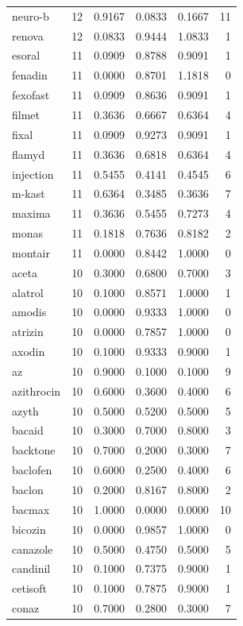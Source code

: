 \begin{longtable}{p{3.0cm}rrrrr}
neuro-b & 12 & 0.9167 & 0.0833 & 0.1667 & 11 \\
renova & 12 & 0.0833 & 0.9444 & 1.0833 & 1 \\
esoral & 11 & 0.0909 & 0.8788 & 0.9091 & 1 \\
fenadin & 11 & 0.0000 & 0.8701 & 1.1818 & 0 \\
fexofast & 11 & 0.0909 & 0.8636 & 0.9091 & 1 \\
filmet & 11 & 0.3636 & 0.6667 & 0.6364 & 4 \\
fixal & 11 & 0.0909 & 0.9273 & 0.9091 & 1 \\
flamyd & 11 & 0.3636 & 0.6818 & 0.6364 & 4 \\
injection & 11 & 0.5455 & 0.4141 & 0.4545 & 6 \\
m-kast & 11 & 0.6364 & 0.3485 & 0.3636 & 7 \\
maxima & 11 & 0.3636 & 0.5455 & 0.7273 & 4 \\
monas & 11 & 0.1818 & 0.7636 & 0.8182 & 2 \\
montair & 11 & 0.0000 & 0.8442 & 1.0000 & 0 \\
aceta & 10 & 0.3000 & 0.6800 & 0.7000 & 3 \\
alatrol & 10 & 0.1000 & 0.8571 & 1.0000 & 1 \\
amodis & 10 & 0.0000 & 0.9333 & 1.0000 & 0 \\
atrizin & 10 & 0.0000 & 0.7857 & 1.0000 & 0 \\
axodin & 10 & 0.1000 & 0.9333 & 0.9000 & 1 \\
az & 10 & 0.9000 & 0.1000 & 0.1000 & 9 \\
azithrocin & 10 & 0.6000 & 0.3600 & 0.4000 & 6 \\
azyth & 10 & 0.5000 & 0.5200 & 0.5000 & 5 \\
bacaid & 10 & 0.3000 & 0.7000 & 0.8000 & 3 \\
backtone & 10 & 0.7000 & 0.2000 & 0.3000 & 7 \\
baclofen & 10 & 0.6000 & 0.2500 & 0.4000 & 6 \\
baclon & 10 & 0.2000 & 0.8167 & 0.8000 & 2 \\
bacmax & 10 & 1.0000 & 0.0000 & 0.0000 & 10 \\
bicozin & 10 & 0.0000 & 0.9857 & 1.0000 & 0 \\
canazole & 10 & 0.5000 & 0.4750 & 0.5000 & 5 \\
candinil & 10 & 0.1000 & 0.7375 & 0.9000 & 1 \\
cetisoft & 10 & 0.1000 & 0.7875 & 0.9000 & 1 \\
conaz & 10 & 0.7000 & 0.2800 & 0.3000 & 7 \\

\end{longtable}

